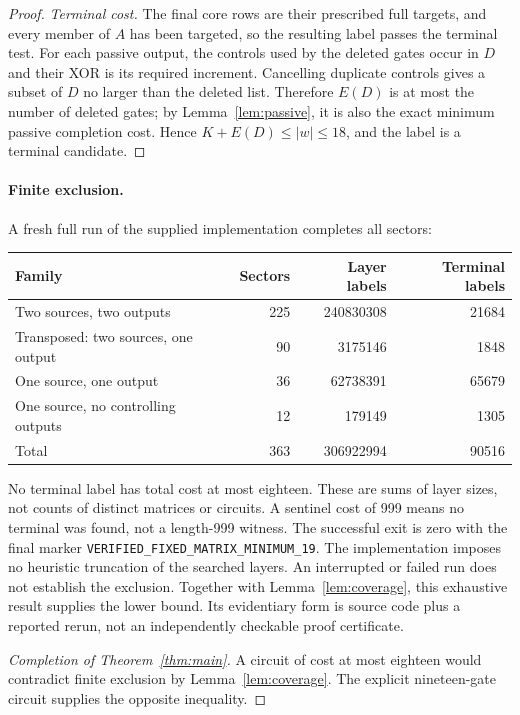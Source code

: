 \documentclass[11pt]{article}
\begin{document}
\begin{proof}
\emph{Terminal cost.}
The final core rows are their prescribed full targets, and every member of
$A$ has been targeted, so the resulting label passes the terminal test. For
each passive output, the controls used by the deleted gates occur in $D$ and
their XOR is its required increment. Cancelling duplicate controls gives a
subset of $D$ no larger than the deleted list. Therefore
$E(D)$ is at most the number of deleted gates; by Lemma~\ref{lem:passive},
it is also the exact minimum passive completion cost. Hence
$K+E(D)\le |w|\le18$, and the label is a
terminal candidate.
\end{proof}

\paragraph{Finite exclusion.}
A fresh full run of the supplied implementation completes all sectors:
\begin{center}\begin{tabular}{lrrr}\toprule
Family&Sectors&Layer labels&Terminal labels\\\midrule
Two sources, two outputs&225&240830308&21684\\
Transposed: two sources, one output&90&3175146&1848\\
One source, one output&36&62738391&65679\\
One source, no controlling outputs&12&179149&1305\\\midrule
Total&363&306922994&90516\\\bottomrule
\end{tabular}\end{center}
No terminal label has total cost at most eighteen. These are sums of
layer sizes, not counts of distinct matrices or circuits. A sentinel
cost of 999 means no terminal was found, not a length-999 witness.
The successful exit is zero with the final marker
\texttt{VERIFIED\_FIXED\_MATRIX\_MINIMUM\_19}.
The implementation imposes no heuristic truncation of the searched layers.
An interrupted or failed run does not establish the exclusion.
Together with Lemma~\ref{lem:coverage}, this exhaustive result supplies the
lower bound. Its evidentiary form is source code plus a reported rerun, not an
independently checkable proof certificate.

\begin{proof}[Completion of Theorem~\ref{thm:main}]
A circuit of cost at most eighteen would contradict finite exclusion
by Lemma~\ref{lem:coverage}. The explicit nineteen-gate circuit supplies
the opposite inequality.
\end{proof}
\end{document}
